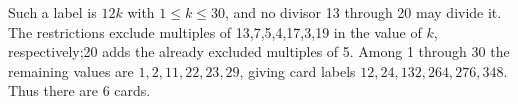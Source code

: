 Such a label is $12k$ with $1\le k\le30$, and no divisor 13 through 20 may divide it. The restrictions exclude multiples of 13,7,5,4,17,3,19 in the value of $k$, respectively;20 adds the already excluded multiples of 5. Among 1 through 30 the remaining values are $1,2,11,22,23,29$, giving card labels $12,24,132,264,276,348$. Thus there are $\boxed6$ cards.
